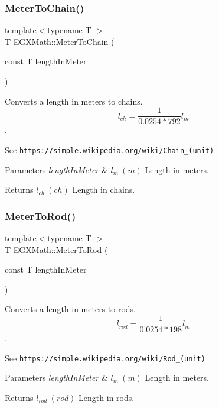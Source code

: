 \subsubsection{\texorpdfstring{Meter\+To\+Chain()}{MeterToChain()}}
{\footnotesize\ttfamily template$<$typename T $>$ \\
T E\+G\+X\+Math\+::\+Meter\+To\+Chain (\begin{DoxyParamCaption}\item[{const T}]{length\+In\+Meter }\end{DoxyParamCaption})}



Converts a length in meters to chains. \[ l_{ch}= \frac{1}{0.0254 * 792} l_{m} \]. 

See \href{https://simple.wikipedia.org/wiki/Chain_(unit)}{\tt https\+://simple.\+wikipedia.\+org/wiki/\+Chain\+\_\+(unit)} 
\begin{DoxyParams}{Parameters}
{\em length\+In\+Meter} & $ l_{m}\ (m)$ Length in meters. \\
\hline
\end{DoxyParams}
\begin{DoxyReturn}{Returns}
$ l_{ch}\ (ch)$ Length in chains. 
\end{DoxyReturn}
\mbox{\label{group___e_g_x_math-_conversions-_length_conversions-_meter-_surveyors_ga45c89e4e6dd1d1e3f2a6c4f4a1051543}} 
\subsubsection{\texorpdfstring{Meter\+To\+Rod()}{MeterToRod()}}
{\footnotesize\ttfamily template$<$typename T $>$ \\
T E\+G\+X\+Math\+::\+Meter\+To\+Rod (\begin{DoxyParamCaption}\item[{const T}]{length\+In\+Meter }\end{DoxyParamCaption})}



Converts a length in meters to rods. \[ l_{rod}= \frac{1}{0.0254 * 198} l_{m} \]. 

See \href{https://simple.wikipedia.org/wiki/Rod_(unit)}{\tt https\+://simple.\+wikipedia.\+org/wiki/\+Rod\+\_\+(unit)} 
\begin{DoxyParams}{Parameters}
{\em length\+In\+Meter} & $ l_{m}\ (m)$ Length in meters. \\
\hline
\end{DoxyParams}
\begin{DoxyReturn}{Returns}
$ l_{rod}\ (rod)$ Length in rods. 
\end{DoxyReturn}

